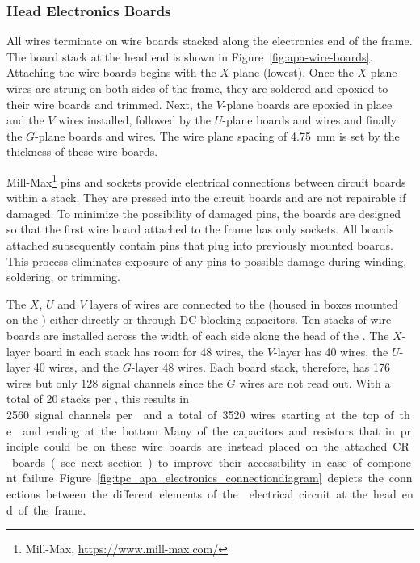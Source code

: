 \subsubsection{Head Electronics Boards}

All  wires terminate on wire boards stacked along the electronics end of the  frame.  The board stack at the head end is shown in Figure~\ref{fig:apa-wire-boards}. Attaching the wire boards begins with the $X$-plane (lowest). Once the $X$-plane wires are strung on both sides of the  frame, they are soldered and epoxied to their wire boards and trimmed. Next, the $V$-plane boards are epoxied in place and the $V$ wires installed, followed by the $U$-plane boards and wires and finally the $G$-plane boards and wires. The wire plane spacing of \SI{4.75}{mm} is set by the thickness of these wire boards.   

Mill-Max\footnote{Mill-Max\texttrademark{}, \url{https://www.mill-max.com/}} pins and sockets provide electrical connections between circuit boards within a stack. They are pressed into the circuit boards and are not repairable if damaged. To minimize the possibility of damaged pins, the boards are designed so that the first wire board attached to the frame has only sockets. All boards attached subsequently contain pins that plug into previously mounted boards. This process eliminates exposure of any pins to possible damage during winding, soldering, or trimming.

The $X$, $U$ and $V$ layers of wires are connected to the  (housed in boxes mounted on the ) either directly or through DC-blocking capacitors.  Ten stacks of wire boards are installed across the width of each side along the head of the .  The $X$-layer board in each stack has room for \num{48} wires, the $V$-layer has 40 wires, the $U$-layer \num{40} wires, and the $G$-layer \num{48} wires.  Each board stack, therefore, has 176 wires but only \num{128} signal channels since the $G$ wires are not read out. With a total of \num{20} stacks per , this results in \SI{2560} signal channels per  and a total of \SI{3520} wires starting at the top of the  and ending at the bottom. Many of the capacitors and resistors that in principle could be on these wire boards are instead placed on the attached CR boards (see next section) to improve their accessibility in case of component failure. Figure~\ref{fig:tpc_apa_electronics_connectiondiagram} depicts the connections between the different elements of the  electrical circuit at the head end of the frame. 

